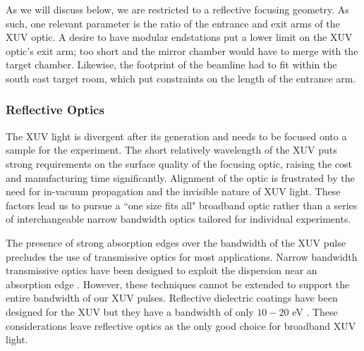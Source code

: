 As we will discuss below, we are restricted to a reflective focusing geometry. As such, one relevant parameter is the ratio of the entrance and exit arms of the XUV optic. A desire to have modular endstations put a lower limit on the XUV optic's exit arm; too short and the mirror chamber would have to merge with the target chamber. Likewise, the footprint of the beamline had to fit within the south east target room, which put constraints on the length of the entrance arm.



\subsubsection{Reflective Optics}

The XUV light is divergent after its generation and needs to be focused onto a sample for the experiment. The short relatively wavelength of the XUV puts strong requirements on the surface quality of the focusing optic, raising the cost and manufacturing time significantly. Alignment of the optic is frustrated by the need for in-vacuum propagation and the invisible nature of XUV light. These factors lead us to pursue a ``one size fits all" broadband optic rather than a series of interchangeable narrow bandwidth optics tailored for individual experiments.

The presence of strong absorption edges over the bandwidth of the XUV pulse precludes the use of transmissive optics for most applications. Narrow bandwidth transmissive optics have been designed to exploit the dispersion near an absorption edge \cite{drescherExtremeultravioletRefractiveOptics2018}. However, these techniques cannot be extended to support the entire bandwidth of our XUV pulses. Reflective dielectric coatings have been designed for the XUV but they have a bandwidth of only $10-20$ eV \cite{kiesewetterDynamicsNearThresholdAttosecond2019}. These considerations leave reflective optics as the only good choice for broadband XUV light.


